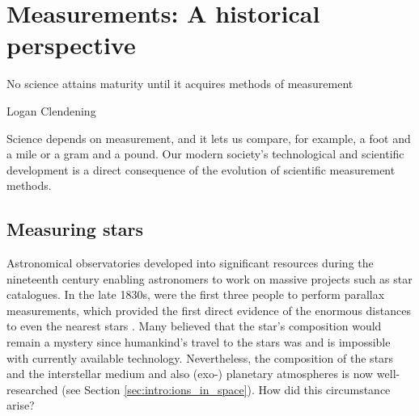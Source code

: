 \section{Measurements: A historical perspective}
\label{sec:intro:measurements}

\epigraph{No science attains maturity until it acquires methods of measurement}{Logan Clendening}

Science depends on measurement, and it lets us compare, for example, a foot and a mile or a gram and a pound. Our modern society's technological and scientific development is a direct consequence of the evolution of scientific measurement methods.

\subsection{Measuring stars}
\dropcap A{stronomical} observatories developed into significant resources during the nineteenth century enabling astronomers to work on massive projects such as star catalogues. In the late 1830s, \citet{bessel_parallax_1838, henderson_parallax_1840, struve_stellarum_1837} were the first three people to perform parallax measurements, which provided the first direct evidence of the enormous distances to even the nearest stars \cite{reid_first_2020}. Many believed that the star's composition would remain a mystery since humankind's travel to the stars was and is impossible with currently available technology. Nevertheless, the composition of the stars and the interstellar medium and also (exo-) planetary atmospheres is now well-researched (see Section \ref{sec:intro:ions_in_space}). How did this circumstance arise?


